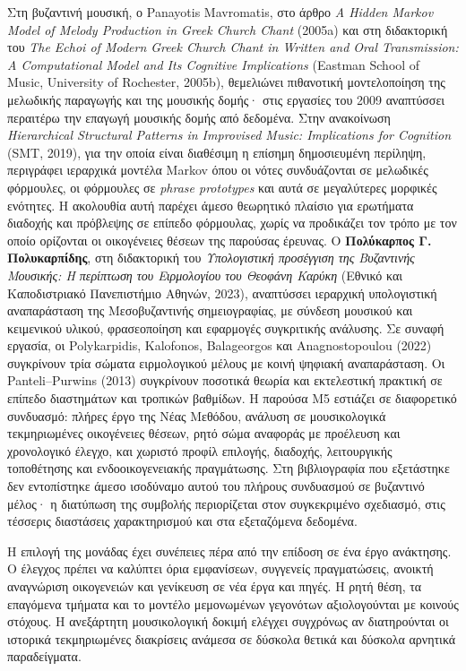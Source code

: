 \documentclass[11pt,a4paper]{article}
\begin{document}
Στη βυζαντινή μουσική, ο Panayotis Mavromatis, στο άρθρο \emph{A Hidden Markov Model of Melody Production in Greek Church Chant} (2005a) και στη διδακτορική του \emph{The Echoi of Modern Greek Church Chant in Written and Oral Transmission: A Computational Model and Its Cognitive Implications} (Eastman School of Music, University of Rochester, 2005b), θεμελιώνει πιθανοτική μοντελοποίηση της μελωδικής παραγωγής και της μουσικής δομής· στις εργασίες του 2009 αναπτύσσει περαιτέρω την επαγωγή μουσικής δομής από δεδομένα. Στην ανακοίνωση \emph{Hierarchical Structural Patterns in Improvised Music: Implications for Cognition} (SMT, 2019), για την οποία είναι διαθέσιμη η επίσημη δημοσιευμένη περίληψη, περιγράφει ιεραρχικά μοντέλα Markov όπου οι νότες συνδυάζονται σε μελωδικές φόρμουλες, οι φόρμουλες σε \emph{phrase prototypes} και αυτά σε μεγαλύτερες μορφικές ενότητες. Η ακολουθία αυτή παρέχει άμεσο θεωρητικό πλαίσιο για ερωτήματα διαδοχής και πρόβλεψης σε επίπεδο φόρμουλας, χωρίς να προδικάζει τον τρόπο με τον οποίο ορίζονται οι οικογένειες θέσεων της παρούσας έρευνας. Ο \textbf{Πολύκαρπος Γ. Πολυκαρπίδης}, στη διδακτορική του \emph{Υπολογιστική προσέγγιση της Βυζαντινής Μουσικής: Η περίπτωση του Ειρμολογίου του Θεοφάνη Καρύκη} (Εθνικό και Καποδιστριακό Πανεπιστήμιο Αθηνών, 2023), αναπτύσσει ιεραρχική υπολογιστική αναπαράσταση της Μεσοβυζαντινής σημειογραφίας, με σύνδεση μουσικού και κειμενικού υλικού, φρασεοποίηση και εφαρμογές συγκριτικής ανάλυσης. Σε συναφή εργασία, οι Polykarpidis, Kalofonos, Balageorgos και Anagnostopoulou (2022) συγκρίνουν τρία σώματα ειρμολογικού μέλους με κοινή ψηφιακή αναπαράσταση. Οι Panteli--Purwins (2013) συγκρίνουν ποσοτικά θεωρία και εκτελεστική πρακτική σε επίπεδο διαστημάτων και τροπικών βαθμίδων. Η παρούσα M5 εστιάζει σε διαφορετικό συνδυασμό: πλήρες έργο της Νέας Μεθόδου, ανάλυση σε μουσικολογικά τεκμηριωμένες οικογένειες θέσεων, ρητό σώμα αναφοράς με προέλευση και χρονολογικό έλεγχο, και χωριστό προφίλ επιλογής, διαδοχής, λειτουργικής τοποθέτησης και ενδοοικογενειακής πραγμάτωσης. Στη βιβλιογραφία που εξετάστηκε δεν εντοπίστηκε άμεσο ισοδύναμο αυτού του πλήρους συνδυασμού σε βυζαντινό μέλος· η διατύπωση της συμβολής περιορίζεται στον συγκεκριμένο σχεδιασμό, στις τέσσερις διαστάσεις χαρακτηρισμού και στα εξεταζόμενα δεδομένα.


Η επιλογή της μονάδας έχει συνέπειες πέρα από την επίδοση σε ένα έργο ανάκτησης. Ο έλεγχος πρέπει να καλύπτει όρια εμφανίσεων, συγγενείς πραγματώσεις, ανοικτή αναγνώριση οικογενειών και γενίκευση σε νέα έργα και πηγές. Η ρητή θέση, τα επαγόμενα τμήματα και το μοντέλο μεμονωμένων γεγονότων αξιολογούνται με κοινούς στόχους. Η ανεξάρτητη μουσικολογική δοκιμή ελέγχει συγχρόνως αν διατηρούνται οι ιστορικά τεκμηριωμένες διακρίσεις ανάμεσα σε δύσκολα θετικά και δύσκολα αρνητικά παραδείγματα.
\end{document}
